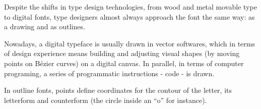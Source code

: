 \documentclass[danish,a2paper,11pt]{scrartcl}
\begin{document}
\vspace{2cm}
\begin{multicols*}{3}
\color{Black}
\metatext
\noindent
Despite the shifts in type design technologies, from wood and metal movable type to digital fonts, type designers almost always approach the font the same way: as a drawing and as outlines.

Nowadays, a digital typeface is usually drawn in vector softwares, which in terms of design experience means building and adjusting visual shapes (by moving points on Bézier curves) on a digital canvas. In parallel, in terms of computer programing, a series of programmatic instructions - code - is drawn.

In outline fonts, points define coordinates for the contour of the letter, its letterform and counterform (the circle inside an “o” for instance).


\end{multicols*}
\end{document}
